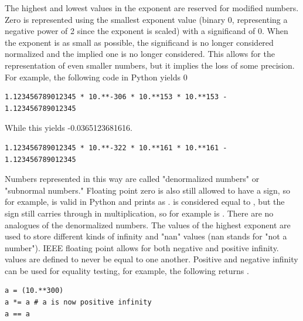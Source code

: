The highest and lowest values in the exponent are reserved for modified numbers.
Zero is represented using the smallest exponent value (binary 0, representing a negative power of 2 since the exponent is scaled) with a significand of 0.
When the exponent is as small as possible, the significand is no longer considered normalized and the implied one is no longer considered.
This allows for the representation of even smaller numbers, but it implies the loss of some precision.
For example, the following code in Python yields 0
\begin{lstlisting}
1.123456789012345 * 10.**-306 * 10.**153 * 10.**153 - 1.123456789012345
\end{lstlisting}
While this yields -0.0365123681616.
\begin{lstlisting}
1.123456789012345 * 10.**-322 * 10.**161 * 10.**161 - 1.123456789012345
\end{lstlisting}
Numbers represented in this way are called "denormalized numbers" or "subnormal numbers."
Floating point zero is also still allowed to have a sign, so for example,  is valid in Python and prints as .
 is considered equal to , but the sign still carries through in multiplication, so for example  is .
There are no analogues of the denormalized numbers.
The values of the highest exponent are used to store different kinds of infinity and "nan" values (nan stands for "not a number").
IEEE floating point allows for both negative and positive infinity.
 values are defined to never be equal to one another.
Positive and negative infinity can be used for equality testing, for example, the following returns .
\begin{lstlisting}
a = (10.**300)
a *= a # a is now positive infinity
a == a
\end{lstlisting}


